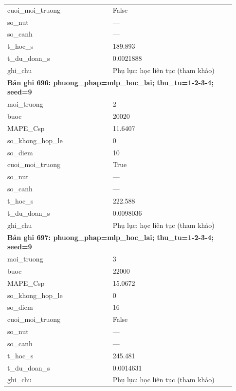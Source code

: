 \begin{longtable}{p{0.43\linewidth}p{0.50\linewidth}}
cuoi\_\allowbreak moi\_\allowbreak truong & False \\
so\_\allowbreak nut & — \\
so\_\allowbreak canh & — \\
t\_\allowbreak hoc\_\allowbreak s & 189.893 \\
t\_\allowbreak du\_\allowbreak doan\_\allowbreak s & 0.0021888 \\
ghi\_\allowbreak chu & Phụ lục: học liên tục (tham khảo) \\
\midrule
\multicolumn{2}{p{0.95\linewidth}}{\textbf{Bản ghi 696: phuong\_phap=mlp\_hoc\_lai; thu\_tu=1-2-3-4; seed=9}} \\
moi\_\allowbreak truong & 2 \\
buoc & 20020 \\
MAPE\_\allowbreak Csp & 11.6407 \\
so\_\allowbreak khong\_\allowbreak hop\_\allowbreak le & 0 \\
so\_\allowbreak diem & 10 \\
cuoi\_\allowbreak moi\_\allowbreak truong & True \\
so\_\allowbreak nut & — \\
so\_\allowbreak canh & — \\
t\_\allowbreak hoc\_\allowbreak s & 222.588 \\
t\_\allowbreak du\_\allowbreak doan\_\allowbreak s & 0.0098036 \\
ghi\_\allowbreak chu & Phụ lục: học liên tục (tham khảo) \\
\midrule
\multicolumn{2}{p{0.95\linewidth}}{\textbf{Bản ghi 697: phuong\_phap=mlp\_hoc\_lai; thu\_tu=1-2-3-4; seed=9}} \\
moi\_\allowbreak truong & 3 \\
buoc & 22000 \\
MAPE\_\allowbreak Csp & 15.0672 \\
so\_\allowbreak khong\_\allowbreak hop\_\allowbreak le & 0 \\
so\_\allowbreak diem & 16 \\
cuoi\_\allowbreak moi\_\allowbreak truong & False \\
so\_\allowbreak nut & — \\
so\_\allowbreak canh & — \\
t\_\allowbreak hoc\_\allowbreak s & 245.481 \\
t\_\allowbreak du\_\allowbreak doan\_\allowbreak s & 0.0014631 \\
ghi\_\allowbreak chu & Phụ lục: học liên tục (tham khảo) \\

\end{longtable}
